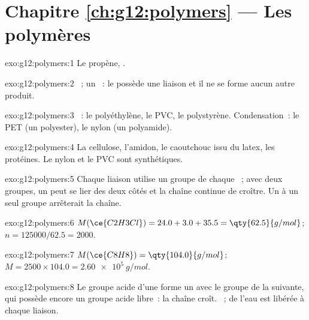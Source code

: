 \section*{Chapitre \ref{ch:g12:polymers} --- Les polymères}

\begin{solution}{exo:g12:polymers:1}
Le propène, .
\end{solution}

\begin{solution}{exo:g12:polymers:2}
~; un ~: le  possède une
liaison  et il ne se forme aucun autre produit.
\end{solution}

\begin{solution}{exo:g12:polymers:3}
~: le polyéthylène, le PVC, le polystyrène. Condensation~: le
PET (un polyester), le nylon (un polyamide).
\end{solution}

\begin{solution}{exo:g12:polymers:4}
La cellulose, l'amidon, le caoutchouc issu du latex, les protéines. Le
nylon et le PVC sont synthétiques.
\end{solution}

\begin{solution}{exo:g12:polymers:5}
Chaque liaison utilise un groupe de chaque ~; avec deux groupes,
un  peut se lier des deux côtés et la chaîne continue de
croître. Un  à un seul groupe arrêterait la chaîne.
\end{solution}

\begin{solution}{exo:g12:polymers:6}
$M(\ce{C2H3Cl}) = 24.0 + 3.0 + 35.5 = \qty{62.5}{g/mol}$;
$n = 125000/62.5 = 2000$.
\end{solution}

\begin{solution}{exo:g12:polymers:7}
$M(\ce{C8H8}) = \qty{104.0}{g/mol}$; $M = 2500 \times 104.0 =
\qty{2.60e5}{g/mol}$.
\end{solution}

\begin{solution}{exo:g12:polymers:8}
Le groupe acide d'une  forme un  avec le groupe  de
la suivante, qui possède encore un groupe acide libre~: la chaîne
croît. 
~; de l'eau est libérée à chaque liaison.
\end{solution}

